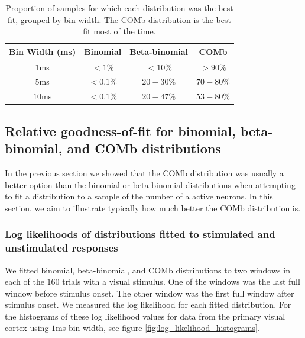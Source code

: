   \begin{table}
    \centering
    \begin{tabular}[h]{|c|c|c|c|}
      \hline
      \textbf{Bin Width (ms)} & \textbf{Binomial}  & \textbf{Beta-binomial} & \textbf{COMb}  \\ \hline
      $1$ms                   & $<1\%$                        & $<10\%$                           & $>90\%$                   \\ \hline
      $5$ms                   & $<0.1\%$                      & $20-30\%$                         & $70-80\%$                 \\ \hline
      $10$ms                  & $<0.1\%$                      & $20-47\%$                         & $53-80\%$                 \\ \hline
    \end{tabular}
    \caption{Proportion of samples for which each distribution was the best fit, grouped by bin width. The COMb distribution is the best fit most of the time.}
    \label{tab:proportions}
  \end{table}

  \newpage

  \subsection{Relative goodness-of-fit for binomial, beta-binomial, and COMb distributions}
  In the previous section we showed that the COMb distribution was usually a better option than the binomial or beta-binomial distributions when attempting to fit a distribution to a sample of the number of a active neurons. In this section, we aim to illustrate typically how much better the COMb distribution is.

    \subsubsection{Log likelihoods of distributions fitted to stimulated and unstimulated responses}\label{sec:log_likelihood_histograms}
    We fitted binomial, beta-binomial, and COMb distributions to two windows in each of the $160$ trials with a visual stimulus. One of the windows was the last full window before stimulus onset. The other window was the first full window after stimulus onset. We measured the log likelihood for each fitted distribution. For the histograms of these log likelihood values for data from the primary visual cortex using $1$ms bin width, see figure \ref{fig:log_likelihood_histograms}.

